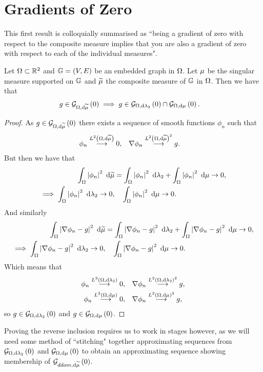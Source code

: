 \documentclass[11pt]{report}
\begin{document}
\chapter{Gradients of Zero}

This first result is colloquially summarised as ``being a gradient of zero with respect to the composite measure implies that you are also a gradient of zero with respect to each of the individual measures".
\begin{lemma} \label{lem:GradZeroCompositeImpliesGradZeroOthers}
	Let $\Omega\subset\mathbb{R}^2$ and $\mathbb{G}=\left( V,E \right)$ be an embedded graph in $\Omega$.
	Let $\mu$ be the singular measure supported on $\mathbb{G}$ and $\widetilde{\mu}$ the composite measure of $\mathbb{G}$ in $\Omega$.
	Then we have that
	\begin{align*}
		g\in\mathcal{G}_{ \Omega, \mathrm{d}\widetilde{\mu}}\left( 0 \right) &\implies g\in\mathcal{G}_{ \Omega, \mathrm{d}\lambda_2}\left( 0 \right)\cap\mathcal{G}_{ \Omega, \mathrm{d}\mu}\left( 0 \right).
	\end{align*}
\end{lemma}
\begin{proof}
	As $g\in\mathcal{G}_{ \Omega, \mathrm{d}\widetilde{\mu}}\left( 0 \right)$ there exists a sequence of smooth functions $\phi_n$ such that
	\begin{align*}
		\phi_n \overset{L^{2}\left( \Omega,\mathrm{d}\widetilde{\mu} \right)}{\longrightarrow} 0, &\quad \nabla\phi_n \overset{L^{2}\left( \Omega,\mathrm{d}\widetilde{\mu} \right)^2}{\longrightarrow} g.
	\end{align*}
	But then we have that
	\begin{align*}
		\int_{\Omega}\left\lvert \phi_n \right\rvert^2 \ \mathrm{d}\widetilde{\mu}
		&= \int_{\Omega}\left\lvert \phi_n \right\rvert^2 \ \mathrm{d}\lambda_2 + \int_{\Omega}\left\lvert \phi_n \right\rvert^2 \ \mathrm{d}\mu \rightarrow 0, \\
		\implies \int_{\Omega}\left\lvert \phi_n \right\rvert^2 \ \mathrm{d}\lambda_2\rightarrow0, &\quad \int_{\Omega}\left\lvert \phi_n \right\rvert^2 \ \mathrm{d}\mu \rightarrow 0.
	\end{align*}
	And similarly
	\begin{align*}
		\int_{\Omega}\left\lvert \nabla\phi_n-g \right\rvert^2 \ \mathrm{d}\widetilde{\mu}
		&= \int_{\Omega}\left\lvert \nabla\phi_n-g \right\rvert^2 \ \mathrm{d}\lambda_2 + \int_{\Omega}\left\lvert \nabla\phi_n-g \right\rvert^2 \ \mathrm{d}\mu \rightarrow 0, \\
		\implies \int_{\Omega}\left\lvert \nabla\phi_n-g \right\rvert^2 \ \mathrm{d}\lambda_2\rightarrow0, &\quad \int_{\Omega}\left\lvert \nabla\phi_n-g \right\rvert^2 \ \mathrm{d}\mu \rightarrow 0.
	\end{align*}
	Which means that
	\begin{align*}
		\phi_n \overset{L^{2}\left( \Omega,\mathrm{d}\lambda_2 \right)}{\longrightarrow} 0, &\quad \nabla\phi_n \overset{L^{2}\left( \Omega,\mathrm{d}\lambda_2 \right)^2}{\longrightarrow} g, \\
		\phi_n \overset{L^{2}\left( \Omega,\mathrm{d}\mu \right)}{\longrightarrow} 0, &\quad \nabla\phi_n \overset{L^{2}\left( \Omega,\mathrm{d}\mu \right)^2}{\longrightarrow} g,
	\end{align*}
	so $g\in\mathcal{G}_{ \Omega, \mathrm{d}\lambda_2}\left( 0 \right)$ and $g\in\mathcal{G}_{ \Omega, \mathrm{d}\mu}\left( 0 \right)$.
\end{proof}
Proving the reverse inclusion requires us to work in stages however, as we will need some method of ``stitching" together approximating sequences from $\mathcal{G}_{ \Omega, \mathrm{d}\lambda_2}\left( 0 \right)$ and $\mathcal{G}_{ \Omega, \mathrm{d}\mu}\left( 0 \right)$ to obtain an approximating sequence showing membership of $\mathcal{G}_{ ddom, \mathrm{d}\widetilde{\mu}}\left( 0 \right)$.
\end{document}
